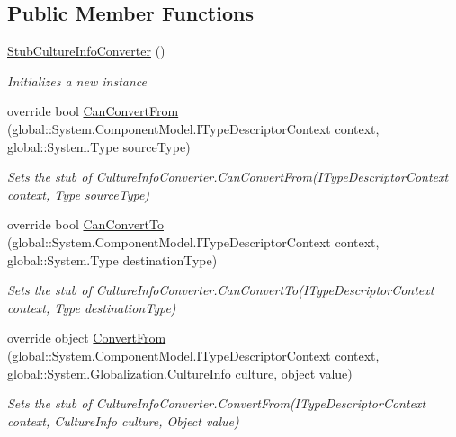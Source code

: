\subsection*{Public Member Functions}
\begin{DoxyCompactItemize}
\item 
\hyperlink{class_system_1_1_component_model_1_1_fakes_1_1_stub_culture_info_converter_a2843027b16d41332d64a58b54e057bfb}{Stub\-Culture\-Info\-Converter} ()
\begin{DoxyCompactList}\small\item\em Initializes a new instance\end{DoxyCompactList}\item 
override bool \hyperlink{class_system_1_1_component_model_1_1_fakes_1_1_stub_culture_info_converter_a66b27bf6a3b703a450275f1f204154bb}{Can\-Convert\-From} (global\-::\-System.\-Component\-Model.\-I\-Type\-Descriptor\-Context context, global\-::\-System.\-Type source\-Type)
\begin{DoxyCompactList}\small\item\em Sets the stub of Culture\-Info\-Converter.\-Can\-Convert\-From(\-I\-Type\-Descriptor\-Context context, Type source\-Type)\end{DoxyCompactList}\item 
override bool \hyperlink{class_system_1_1_component_model_1_1_fakes_1_1_stub_culture_info_converter_a62ce36133cb339b14402b7874e92b5b2}{Can\-Convert\-To} (global\-::\-System.\-Component\-Model.\-I\-Type\-Descriptor\-Context context, global\-::\-System.\-Type destination\-Type)
\begin{DoxyCompactList}\small\item\em Sets the stub of Culture\-Info\-Converter.\-Can\-Convert\-To(\-I\-Type\-Descriptor\-Context context, Type destination\-Type)\end{DoxyCompactList}\item 
override object \hyperlink{class_system_1_1_component_model_1_1_fakes_1_1_stub_culture_info_converter_a8979557eaf68af1edb02ef3cd4630862}{Convert\-From} (global\-::\-System.\-Component\-Model.\-I\-Type\-Descriptor\-Context context, global\-::\-System.\-Globalization.\-Culture\-Info culture, object value)
\begin{DoxyCompactList}\small\item\em Sets the stub of Culture\-Info\-Converter.\-Convert\-From(\-I\-Type\-Descriptor\-Context context, Culture\-Info culture, Object value)\end{DoxyCompactList}\item 

\end{DoxyCompactItemize}
